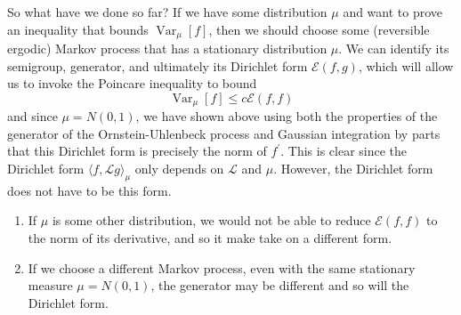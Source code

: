 \documentclass{article}
\DeclareMathOperator{\Var}{Var}
\theoremstyle{definition}
\theoremstyle{remark}
\theoremstyle{definition}
\begin{document}
  So what have we done so far? If we have some distribution $\mu$ and want to prove an inequality that bounds $\Var_\mu [f]$, then we should choose some (reversible ergodic) Markov process that has a stationary distribution $\mu$. We can identify its semigroup, generator, and ultimately its Dirichlet form $\mathcal{E}(f, g)$, which will allow us to invoke the Poincare inequality to bound 
  \[\Var_\mu [f] \leq c \mathcal{E}(f, f)\]
  and since $\mu = N(0, 1)$, we have shown above using both the properties of the generator of the Ornstein-Uhlenbeck process and Gaussian integration by parts that this Dirichlet form is precisely the norm of $f^\prime$. This is clear since the Dirichlet form $\langle f, \mathscr{L} g\rangle_\mu$ only depends on $\mathscr{L}$ and $\mu$. However, the Dirichlet form does not have to be this form. 
  \begin{enumerate}
      \item If $\mu$ is some other distribution, we would not be able to reduce $\mathcal{E}(f, f)$ to the norm of its derivative, and so it make take on a different form. 
      \item If we choose a different Markov process, even with the same stationary measure $\mu = N(0, 1)$, the generator may be different and so will the Dirichlet form. 
  \end{enumerate}
\end{document}
